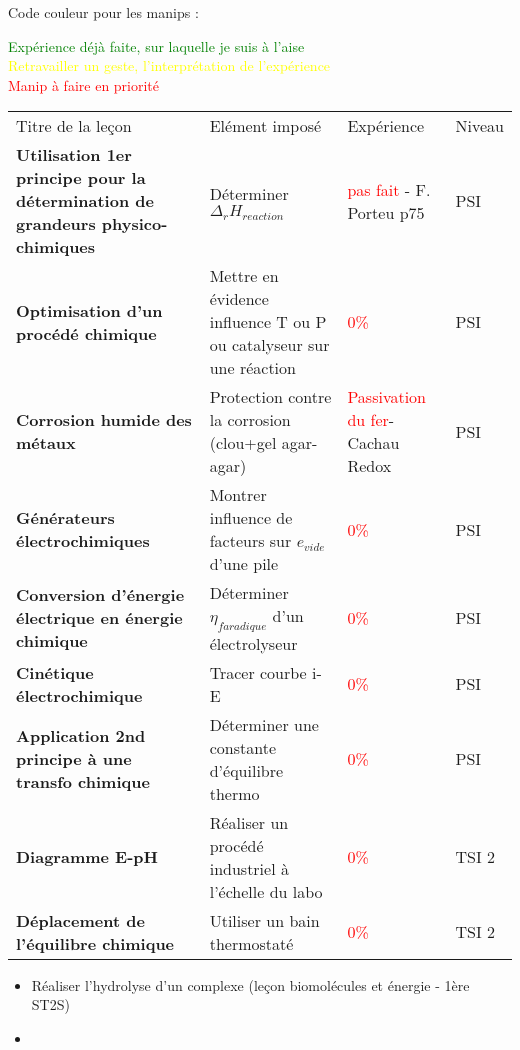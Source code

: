\newpage
\begin{changemargin}{-1.5cm}{-0cm}
Code couleur pour les manips :\\
\begin{center}
\textcolor{green}{Expérience déjà faite, sur laquelle je suis à l'aise}\\
\textcolor{yellow}{Retravailler un geste, l'interprétation de l'expérience}\\
\textcolor{red}{Manip à faire en priorité}\\
\end{center}

\begin{tabularx}{\paperwidth-2cm}{| X | X | X | X |}
  \hline
  \rowcolor{gray!20}\multicolumn{4}{c}{Avancement préparation oraux Leçons Chimie} \\
  \hline 
  Titre de la leçon & Elément imposé & Expérience & Niveau \\
  \hline
  \textbf{Utilisation 1er principe pour la détermination de grandeurs physico-chimiques} & Déterminer $\Delta_rH_{reaction}$ & \textcolor{red}{pas fait} - F. Porteu p75 & PSI \\
  \hline
  \textbf{Optimisation d'un procédé chimique} & Mettre en évidence influence T ou P ou catalyseur sur une réaction & \textcolor{red}{0\%} & PSI \\
  \hline
  \textbf{Corrosion humide des métaux} & Protection contre la corrosion (clou+gel agar-agar) & \textcolor{red}{Passivation du fer}-Cachau Redox & PSI \\
  \hline
  \textbf{Générateurs électrochimiques} & Montrer influence de facteurs sur $e_{vide}$ d'une pile & \textcolor{red}{0\%} & PSI \\
  \hline
  \textbf{Conversion d'énergie électrique en énergie chimique} & Déterminer $\eta_{faradique}$ d'un électrolyseur & \textcolor{red}{0\%} & PSI \\
  \hline
  \textbf{Cinétique électrochimique} & Tracer courbe i-E & \textcolor{red}{0\%} & PSI \\
  \hline
  \textbf{Application 2nd principe à une transfo chimique} & Déterminer une constante d'équilibre thermo & \textcolor{red}{0\%} & PSI \\
  \hline
  \hline
  \textbf{Diagramme E-pH} & Réaliser un procédé industriel à l'échelle du labo & \textcolor{red}{0\%} & TSI 2 \\
  \hline
  \textbf{Déplacement de l'équilibre chimique} & Utiliser un bain thermostaté & \textcolor{red}{0\%} & TSI 2 \\
  \hline  
\end{tabularx}

\begin{headerBlock}
\begin{itemize}
    \item Réaliser l'hydrolyse d'un complexe (leçon biomolécules et énergie - 1ère ST2S)
    \item 
\end{itemize}

\end{headerBlock}
\end{changemargin}

